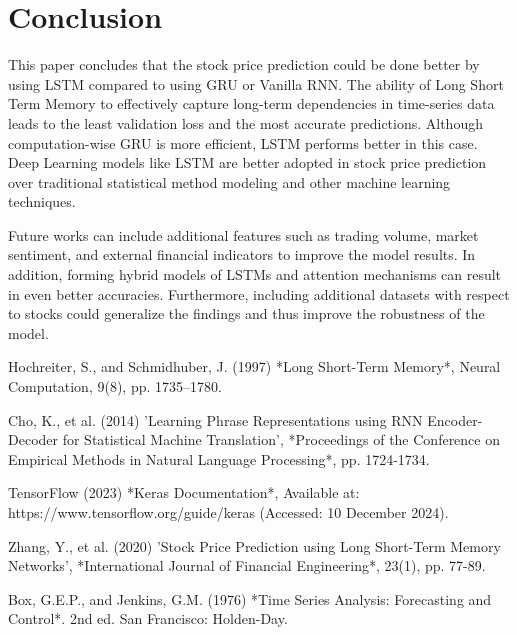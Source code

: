 \documentclass[10pt,twocolumn,a4paper]{article}
\begin{document}
\section{Conclusion}
This paper concludes that the stock price prediction could be done better by using LSTM compared to using GRU or Vanilla RNN. The ability of Long Short Term Memory to effectively capture long-term dependencies in time-series data leads to the least validation loss and the most accurate predictions. Although computation-wise GRU is more efficient, LSTM performs better in this case. Deep Learning models like LSTM are better adopted in stock price prediction over traditional statistical method modeling and other machine learning techniques.

Future works can include additional features such as trading volume, market sentiment, and external financial indicators to improve the model results. In addition, forming hybrid models of LSTMs and attention mechanisms can result in even better accuracies. Furthermore, including additional datasets with respect to stocks could generalize the findings and thus improve the robustness of the model.

\begin{thebibliography}{9}

Hochreiter, S., and Schmidhuber, J. (1997) *Long Short-Term Memory*, Neural Computation, 9(8), pp. 1735–1780.

Cho, K., et al. (2014) 'Learning Phrase Representations using RNN Encoder-Decoder for Statistical Machine Translation', *Proceedings of the Conference on Empirical Methods in Natural Language Processing*, pp. 1724-1734.

TensorFlow (2023) *Keras Documentation*, Available at: https://www.tensorflow.org/guide/keras (Accessed: 10 December 2024).

Zhang, Y., et al. (2020) 'Stock Price Prediction using Long Short-Term Memory Networks', *International Journal of Financial Engineering*, 23(1), pp. 77-89.

Box, G.E.P., and Jenkins, G.M. (1976) *Time Series Analysis: Forecasting and Control*. 2nd ed. San Francisco: Holden-Day.

\end{thebibliography}
\end{document}
